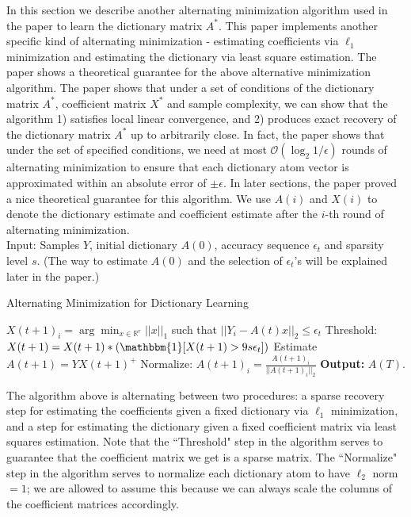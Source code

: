 In this section we describe another alternating minimization algorithm used in the paper \cite{ref1} to learn the dictionary matrix $A^*$. This paper implements another specific kind of alternating minimization - estimating coefficients via $\ell_1$ minimization and estimating the dictionary via least square estimation. The paper shows a theoretical guarantee for the above alternative minimization algorithm. The paper shows that under a set of conditions of the dictionary matrix $A^*$, coefficient matrix $X^*$ and sample complexity, we can show that the algorithm 1) satisfies local linear convergence, and 2) produces exact recovery of the dictionary matrix $A^*$ up to arbitrarily close. In fact, the paper shows that under the set of specified conditions, we need at most $\mathcal{O}(\log_2 1/\epsilon)$ rounds of alternating minimization to ensure that each dictionary atom vector is approximated within an absolute error of $\pm \epsilon$. In later sections, the paper proved a nice theoretical guarantee for this algorithm. We use $A(i)$ and $X(i)$ to denote the dictionary estimate and coefficient estimate after the $i$-th round of alternating minimization.  \\

Input: Samples $Y$, initial dictionary $A(0)$, accuracy sequence $\epsilon_t$ and sparsity level $s$. (The way to estimate $A(0)$ and the selection of $\epsilon_t$'s will be explained later in the paper.)

\begin{algorithm}
\begin{algorithmic}
\caption{Alternating Minimization for Dictionary Learning}
        \STATE $X(t+1)_i = \arg \min_{x \in \mathbb{R}^r}||x||_1$ such that $||Y_i - A(t)x||_2 \leq \epsilon_t$
    \ENDFOR
    \STATE Threshold: $X(t+1) = X(t+1) * (\mathbbm{1}[X(t+1) > 9s\epsilon_t])$
    \STATE Estimate $A(t+1) = YX(t+1)^+$
    \STATE Normalize: $A(t+1)_i = \frac{A(t+1)_i}{||A(t+1)_i||_2}$
\ENDFOR
\STATE \textbf{Output:} $A(T)$.
\end{algorithmic}
\end{algorithm}

The algorithm above is alternating between two procedures: a sparse recovery step for estimating the coefficients given a fixed dictionary via $\ell_1$ minimization, and a step for estimating the dictionary given a fixed coefficient matrix via least squares estimation. Note that the ``Threshold" step in the algorithm serves to guarantee that the coefficient matrix we get is a sparse matrix. The ``Normalize" step in the algorithm serves to normalize each dictionary atom to have $\ell_2$ norm $=1$; we are allowed to assume this because we can always scale the columns of the coefficient matrices accordingly. 


